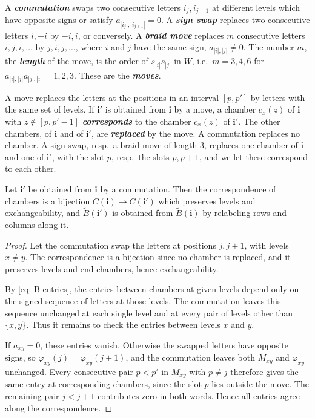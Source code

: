 \documentclass[a4paper]{amsart}
\numberwithin{equation}{section}
\theoremstyle{definition}
\theoremstyle{remark}
\newcommand{\bfi}{\mathbf{i}}
\newcommand{\tB}{\widetilde{B}}
\newcommand{\newword}[1]{\textbf{\emph{#1}}}
\begin{document}
A \newword{commutation} swaps two consecutive letters $i_j,i_{j+1}$ at different levels which have opposite signs or satisfy $a_{|i_j|,|i_{j+1}|}=0$.
A \newword{sign swap} replaces two consecutive letters $i,-i$ by $-i,i$, or conversely.
A \newword{braid move} replaces $m$ consecutive letters $i,j,i,\dots$ by $j,i,j,\dots$, where $i$ and $j$ have the same sign, $a_{|i|,|j|}\neq0$.
The number $m$, the \newword{length} of the move, is the order of $s_{|i|}s_{|j|}$ in $W$, i.e.\ $m=3,4,6$ for $a_{|i|,|j|}a_{|j|,|i|}=1,2,3$.
These are the \newword{moves}.

A move replaces the letters at the positions in an interval $[p,p']$ by letters with the same set of levels.
If $\bfi'$ is obtained from $\bfi$ by a move, a chamber $c_x(z)$ of $\bfi$ with $z\notin[p,p'-1]$ \newword{corresponds} to the chamber $c_x(z)$ of $\bfi'$.
The other chambers, of $\bfi$ and of $\bfi'$, are \newword{replaced} by the move.
A commutation replaces no chamber. A sign swap, resp.\ a braid move of length $3$, replaces one chamber of $\bfi$ and one of $\bfi'$, with the slot $p$, resp.\ the slots $p,p+1$, and we let these correspond to each other.

\begin{lemma}
  \label{lem: commutation}
  Let $\bfi'$ be obtained from $\bfi$ by a commutation.
  Then the correspondence of chambers is a bijection $C(\bfi)\to C(\bfi')$ which preserves levels and exchangeability, and $\tB(\bfi')$ is obtained from $\tB(\bfi)$ by relabeling rows and columns along it.
\end{lemma}
\begin{proof}
  Let the commutation swap the letters at positions $j,j+1$, with levels $x\neq y$.
  The correspondence is a bijection since no chamber is replaced, and it preserves levels and end chambers, hence exchangeability.

  By \eqref{eq: B entries}, the entries between chambers at given levels depend only on the signed sequence of letters at those levels.
  The commutation leaves this sequence unchanged at each single level and at every pair of levels other than $\{x,y\}$.
  Thus it remains to check the entries between levels $x$ and $y$.

  If $a_{xy}=0$, these entries vanish.
  Otherwise the swapped letters have opposite signs, so $\varphi_{xy}(j)=\varphi_{xy}(j+1)$, and the commutation leaves both $M_{xy}$ and $\varphi_{xy}$ unchanged.
  Every consecutive pair $p<p'$ in $M_{xy}$ with $p\neq j$ therefore gives the same entry at corresponding chambers, since the slot $p$ lies outside the move.
  The remaining pair $j<j+1$ contributes zero in both words.
  Hence all entries agree along the correspondence.
\end{proof}
\end{document}
